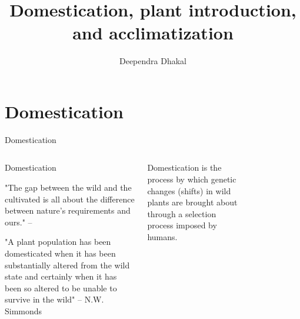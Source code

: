 \documentclass[11pt,ignorenonframetext,aspectratio=169]{beamer}
\title[]{Domestication, plant introduction, and acclimatization}
\author[
        Deependra Dhakal
    ]{Deependra Dhakal}
\institute[
    ]{
    Agriculture and Forestry University\\
\textit{ddhakal.rookie@gmail.com}\\
\url{https://rookie.rbind.io}
    }
\date[
      
  ]{
    }
\begin{document}
  \begin{frame}[plain]
  \titlepage
  \end{frame}



\hypertarget{domestication}{%
\section{Domestication}\label{domestication}}

\begin{frame}{Domestication}
\protect\hypertarget{domestication-1}{}
\begin{columns}[T,onlytextwidth]

  \begin{block}{Domestication}

"The gap between the wild and the cultivated is all about the difference between nature's requirements and ours." -- \cite{kingsbury2009hybrid}

"A plant population has been domesticated when it has been substantially altered from the wild state and certainly when it has been so altered to be unable to survive in the wild" -- N.W. Simmonds
  \end{block}

Domestication is the process by which genetic changes (shifts) in wild plants are brought about through a selection process imposed by humans.


\begin{figure}


\end{figure}
\end{columns}
\end{frame}
\end{document}
